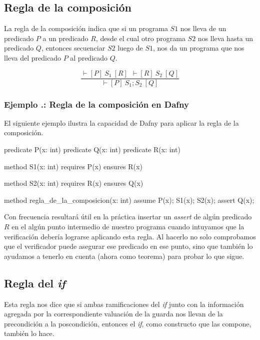 \documentclass[12pt, a4paper, openany, fleqn]{book}
\newcounter{example}[chapter]
\renewcommand{\theexample}{\thechapter.\arabic{example}}
\newcommand{\example}[1]{
  \refstepcounter{example} %
  \subsubsection*{Ejemplo \theexample: #1}
}
\newcommand{\hoareTheorem}[3]{\ensuremath{\vdash[#1]\ #2\ [#3]}}
\newcommand{\inferenceRule}[2]{
    \begin{equation*}
        \frac{#1}{#2}
    \end{equation*}
}
\begin{document}
    \subsection{Regla de la composición}
    La regla de la composición indica que si un programa $S1$ nos lleva de un predicado $P$ a un predicado $R$, desde el cual otro programa $S2$ nos lleva hasta un predicado $Q$, entonces secuenciar $S2$ luego de $S1$, nos da un programa que nos lleva del predicado $P$ al predicado $Q$.

    \inferenceRule{\hoareTheorem{P}{S_1}{R}\ \ \hoareTheorem{R}{S_2}{Q}}{\hoareTheorem{P}{S_1;S_2}{Q}}

    \example{Regla de la composición en Dafny}

    El siguiente ejemplo ilustra la capacidad de Dafny para aplicar la regla de la composición.

    \begin{greenbox}
    \begin{dafny}[gobble=8]
        predicate P(x: int)
        predicate Q(x: int)
        predicate R(x: int)

        method S1(x: int)
            requires P(x)
            ensures R(x)
        
        method S2(x: int)
            requires R(x)
            ensures Q(x)

        method regla_de_la_composicion(x: int)
        {
            assume P(x);
            S1(x);
            S2(x);
            assert Q(x);
        }
    \end{dafny}
    \end{greenbox}
    Con frecuencia resultará útil en la práctica insertar un \textit{assert} de algún predicado $R$ en el algún punto intermedio de nuestro programa cuando intuyamos que la verificación debería lograrse aplicando esta regla. Al hacerlo no solo comprobamos que el verificador puede asegurar ese predicado en ese punto, sino que también lo ayudamos a tenerlo en cuenta (ahora como teorema) para probar lo que sigue.

    \subsection{Regla del \textit{if}}
    Esta regla nos dice que si ambas ramificaciones del \textit{if} junto con la información agregada por la correspondiente valuación de la guarda nos llevan de la precondición a la poscondición, entonces el \textit{if}, como constructo que las compone, también lo hace.
\end{document}

